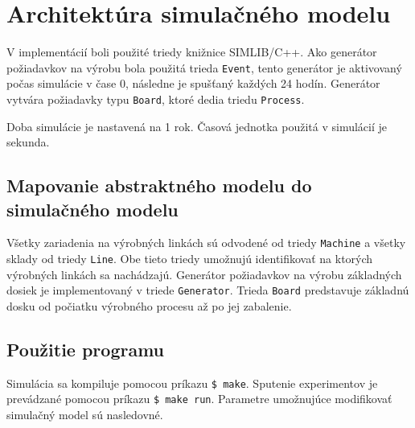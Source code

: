 \documentclass[12pt,a4paper,titlepage,final]{article}
\begin{document}
\section{Architektúra simulačného modelu}
V implementácií boli použité triedy knižnice SIMLIB/C++. Ako generátor požiadavkov
na výrobu bola použitá trieda \texttt{Event}, tento generátor je aktivovaný počas simulácie
v čase 0, následne je spušťaný každých 24 hodín. Generátor vytvára požiadavky typu
\texttt{Board}, ktoré dedia triedu \texttt{Process}.

Doba simulácie je nastavená na 1 rok. Časová jednotka použitá v simulácií je 
sekunda.

\subsection{Mapovanie abstraktného modelu do simulačného modelu}
Všetky zariadenia na výrobných linkách sú odvodené od triedy \texttt{Machine}
a všetky sklady od triedy \texttt{Line}. Obe tieto triedy umožnujú identifikovať
na ktorých výrobných linkách sa nachádzajú. Generátor požiadavkov na výrobu základných
dosiek je implementovaný v triede \texttt{Generator}. Trieda \texttt{Board} predstavuje
základnú dosku od počiatku výrobného procesu až po jej zabalenie. 

\subsection{Použitie programu}
Simulácia sa kompiluje pomocou príkazu \texttt{\$ make}. Sputenie experimentov
je prevádzané pomocou príkazu \texttt{\$ make run}. Parametre umožnujúce modifikovať
simulačný model sú nasledovné.
\end{document}
